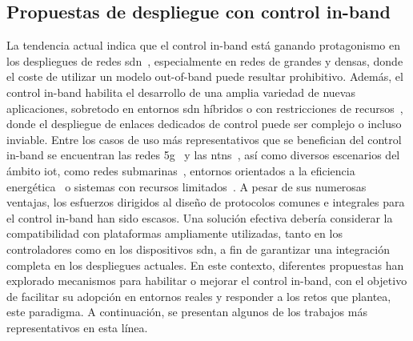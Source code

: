 \subsection{Propuestas de despliegue con control in-band}
\label{subsec:propuestas_inband}

La tendencia actual indica que el control in-band está ganando protagonismo en los despliegues de redes \gls{sdn}~\cite{Awan19}, especialmente en redes de grandes y densas, donde el coste de utilizar un modelo out-of-band puede resultar prohibitivo. Además, el control in-band habilita el desarrollo de una amplia variedad de nuevas aplicaciones, sobretodo en entornos \gls{sdn} híbridos o con restricciones de recursos~\cite{Khorsandroo21,Rojas21}, donde el despliegue de enlaces dedicados de control puede ser complejo o incluso inviable. Entre los casos de uso más representativos que se benefician del control in-band se encuentran las redes \gls{5g}~\cite{Murtadha21} y las \glspl{ntn}~\cite{Guo21}, así como diversos escenarios del ámbito \gls{iot}, como redes submarinas~\cite{Shi22}, entornos orientados a la eficiencia energética~\cite{Maity22} o sistemas con recursos limitados~\cite{Chattopadhyay19}. A pesar de sus numerosas ventajas, los esfuerzos dirigidos al diseño de protocolos comunes e integrales para el control in-band han sido escasos. Una solución efectiva debería considerar la compatibilidad con plataformas ampliamente utilizadas, tanto en los controladores como en los dispositivos \gls{sdn}, a fin de garantizar una integración completa en los despliegues actuales. En este contexto, diferentes propuestas han explorado mecanismos para habilitar o mejorar el control in-band, con el objetivo de facilitar su adopción en entornos reales y responder a los retos que plantea, este paradigma. A continuación, se presentan algunos de los trabajos más representativos en esta línea.\\
\\
